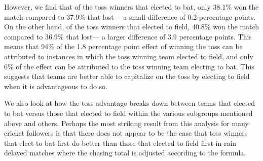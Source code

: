 \documentclass[11pt,  letterpaper]{article}
\begin{document}
However, we find that of the toss winners that elected to bat, only 38.1\% won the match compared to 37.9\% that lost--- a small difference of 0.2 percentage points. On the other hand, of the toss winners that elected to field, 40.8\% won the match compared to 36.9\% that lost--- a larger difference of 3.9 percentage points. This means that 94\% of the 1.8 percentage point effect of winning the toss can be attributed to instances in which the toss winning team elected to field, and only 6\% of the effect can be attributed to the toss winning team electing to bat. This suggests that teams are better able to capitalize on the toss by electing to field when it is advantageous to do so. 
%
%

We also look at how the toss advantage breaks down between teams that elected to bat versus those that elected to field within the various subgroups mentioned above and others. Perhaps the most striking result from this analysis for many cricket followers is that there does not appear to be the case that toss winners that elect to bat first do better than those that elected to field first in rain delayed matches where the chasing total is adjusted according to the \citet{duckworth1998} formula. 
\end{document}
